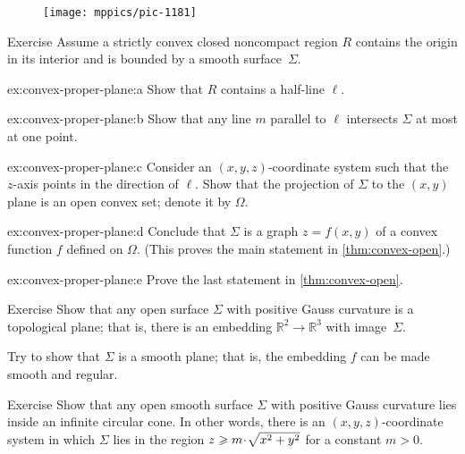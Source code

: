 {

\begin{wrapfigure}{r}{33 mm}
\vskip-0mm
\centering
\texttt{[image: mppics/pic-1181]}
\vskip2mm
\end{wrapfigure}


\begin{thm}{Exercise}\label{ex:convex-proper-plane}
Assume a strictly convex closed noncompact region $R$ contains the origin in its interior and is bounded by a smooth surface~$\Sigma$.

\begin{subthm}{ex:convex-proper-plane:a}
Show that $R$ contains a half-line $\ell$.
\end{subthm}

\begin{subthm}{ex:convex-proper-plane:b}
Show that any line $m$ parallel to $\ell$ intersects $\Sigma$ at most at one point.
\end{subthm}


\begin{subthm}{ex:convex-proper-plane:c}
Consider an $(x,y,z)$-coordinate system such that the $z$-axis points in the direction of $\ell$.
Show that the projection of $\Sigma$ to the $(x,y)$ plane is an open convex set; denote it by $\Omega$.
\end{subthm}

\begin{subthm}{ex:convex-proper-plane:d}
Conclude that $\Sigma$ is a graph $z=f(x,y)$ of a convex function $f$ defined on $\Omega$.
(This proves the main statement in \ref{thm:convex-open}.)
\end{subthm}

\begin{subthm}{ex:convex-proper-plane:e}
Prove the last statement in \ref{thm:convex-open}.
\end{subthm}

\end{thm}

}

\begin{thm}{Exercise}\label{ex:open+convex=plane}
Show that any open surface $\Sigma$ with positive Gauss curvature is a topological plane;
that is, there is an embedding $\mathbb{R}^2\to\mathbb{R}^3$ with image~$\Sigma$.

Try to show that $\Sigma$ is a smooth plane;
that is, the embedding $f$ can be made smooth and regular.
\end{thm}


\begin{thm}{Exercise}\label{ex:circular-cone}
Show that any open smooth surface $\Sigma$ with positive Gauss curvature
lies inside an infinite circular cone. In other words, there is an $(x,y,z)$-coordinate system in which $\Sigma$ lies in the region $z \z\ge m \cdot\sqrt{x^2 + y^2}$ for a constant $m > 0$.
\end{thm} 


